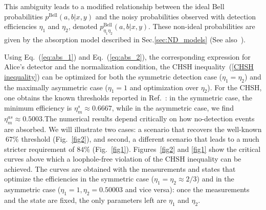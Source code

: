 \documentclass[aps,pra,reprint, superscriptaddress,showkeys]{revtex4-2}
\theoremstyle{plain}
\begin{document}
This ambiguity leads to a modified relationship between the ideal Bell probabilities \(p^{\text{Bell}}(a,b | x,y)\) and the noisy probabilities observed with detection efficiencies \(\eta_1\) and \(\eta_2\), denoted \(p^{\text{Bell}}_{\eta_1 \eta_2}(a,b | x,y)\). These non-ideal probabilities are given by the absorption model described in Sec.\ref{sec:ND_models} (See also~\cite{Wilms2008}).

Using Eq.~(\ref{eq:abs_1}) and Eq.~(\ref{eq:abs_2}), the corresponding expression for Alice's detector and the normalization condition,    the CHSH inequality~(\ref{CHSH inequality}) can be optimized for both the symmetric detection case (\(\eta_1 = \eta_2\)) and the maximally asymmetric case (\(\eta_1 = 1\) and optimization over \(\eta_2\)). For the CHSH, one obtains the known thresholds reported in Ref.~\cite{Wilms2008}: in the symmetric case, the minimum efficiency is \(\eta_m^s \approx 0.6667\), while in the asymmetric case, we find \(\eta_m^{as} \approx 0.5003\).The numerical results depend critically on how no-detection events are absorbed. We will illustrate two cases:  a scenario that recovers the well-known $~67\%$ threshold (Fig.~\ref{fig2}), and second, a different scenario that leads to a much stricter requirement of $84\%$ (Fig.~\ref{fig1}). Figures~\ref{fig2} and \ref{fig1} show the critical curves above which a loophole-free violation of the CHSH inequality can be achieved. The curves are obtained with the measurements and states that optimize the efficiencies in the symmetric case ($\eta_1 = \eta_2 \approx 2/3$) and in the asymmetric case ($\eta_1 =1, \eta_2 =0.50003$ and vice versa): once the measurements and the state are fixed, the only parameters left are $\eta_1$ and $\eta_2$. 
\end{document}
